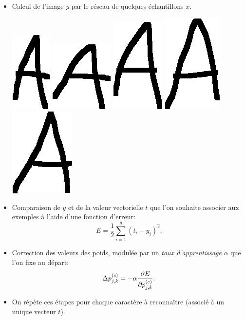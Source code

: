 \clearpage
{}

\begin{slide}

\begin{itemize}

	\item Calcul de l'image $y$ par le réseau de quelques échantillons $x$.
	\begin{center}
		\includegraphics[width=0.075\linewidth]{a/0.png} \quad
		\includegraphics[width=0.075\linewidth]{a/1.png} \quad
		\includegraphics[width=0.075\linewidth]{a/2.png} \quad
		\includegraphics[width=0.075\linewidth]{a/3.png} \quad
		\includegraphics[width=0.075\linewidth]{a/4.png}
	\end{center}
	
	\item Comparaison de $y$ et de la valeur vectorielle $t$ que l'on souhaite associer aux exemples à l'aide d'une fonction d'erreur:
	\begin{equation*}
		E = \frac{1}{2} \sum_{i=1}^q (t_i - y_i)^2.
	\end{equation*}

	\item Correction des valeurs des poids, modulée par un \textit{taux d'apprentissage} $\alpha$ que l'on fixe au départ:
	\begin{equation*}
		\Delta p_{j, k}^{ (c) } = - \alpha \frac{\partial E}{\partial p_{j, k}^{ (c) }}.
	\end{equation*}

	\item On répète ces étapes pour chaque caractère à reconnaître (associé à un unique vecteur $t$).

	\end{itemize}

\end{slide}